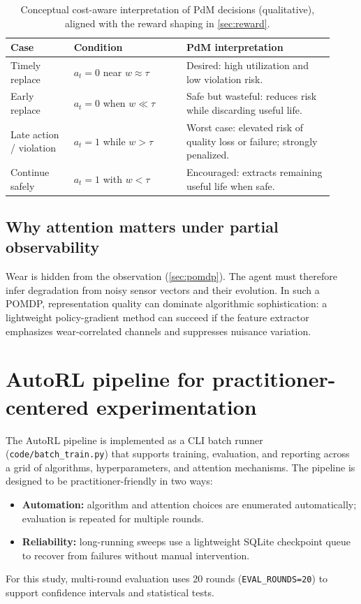 \documentclass[11pt]{article}
\begin{document}
\begin{table}[t]
	\centering
	\caption{Conceptual cost-aware interpretation of PdM decisions (qualitative), aligned with the reward shaping in \cref{sec:reward}.}
	\label{tab:cost_view}
	\begin{tabular}{p{0.18\linewidth} p{0.32\linewidth} p{0.42\linewidth}}
		\toprule
		\rowcolor{gray!20} \textbf{Case} & \textbf{Condition} & \textbf{PdM interpretation}\\
		\midrule
		Timely replace & $a_t=0$ near $w\approx\tau$ & Desired: high utilization and low violation risk.\\
		Early replace & $a_t=0$ when $w\ll\tau$ & Safe but wasteful: reduces risk while discarding useful life.\\
		Late action / violation & $a_t=1$ while $w>\tau$ & Worst case: elevated risk of quality loss or failure; strongly penalized.\\
		Continue safely & $a_t=1$ with $w<\tau$ & Encouraged: extracts remaining useful life when safe.\\
		\bottomrule
	\end{tabular}
\end{table}

\subsection{Why attention matters under partial observability}
Wear is hidden from the observation (\cref{sec:pomdp}). The agent must therefore infer degradation from noisy sensor vectors and their evolution. In such a POMDP, representation quality can dominate algorithmic sophistication: a lightweight policy-gradient method can succeed if the feature extractor emphasizes wear-correlated channels and suppresses nuisance variation.

\section{AutoRL pipeline for practitioner-centered experimentation}
\label{sec:autorl}
The AutoRL pipeline is implemented as a CLI batch runner (\texttt{code/batch\_train.py}) that supports training, evaluation, and reporting across a grid of algorithms, hyperparameters, and attention mechanisms. The pipeline is designed to be practitioner-friendly in two ways:
\begin{itemize}
	\item \textbf{Automation:} algorithm and attention choices are enumerated automatically; evaluation is repeated for multiple rounds.
	\item \textbf{Reliability:} long-running sweeps use a lightweight SQLite checkpoint queue to recover from failures without manual intervention.
\end{itemize}
For this study, multi-round evaluation uses 20 rounds (\texttt{EVAL\_ROUNDS=20}) to support confidence intervals and statistical tests.
\end{document}

